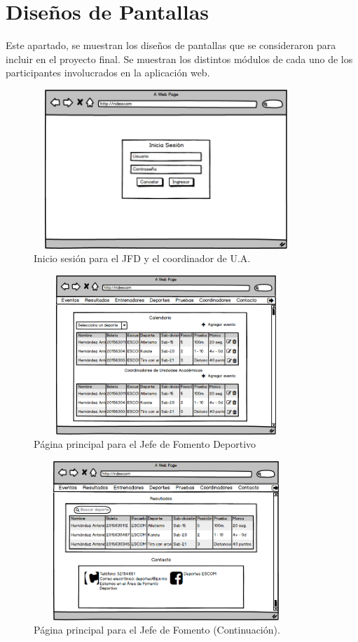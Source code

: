 \chapter{Diseños de Pantallas}
	\label{diseños}
	\noindent Este apartado, se muestran los diseños de pantallas que se consideraron para incluir en el proyecto final. Se muestran los distintos módulos de cada uno de los participantes involucrados en la aplicación web.
	
		\begin{figure}[hbt!]
			\centering
			\includegraphics[width=10cm, height=6cm]{Imagenes/Nuevos/P1_LoginJFD_coord}
			\caption{Inicio sesión para el JFD y el coordinador de U.A.}
			\label{inicioJFDycoord}
		\end{figure}
		\pagebreak
		
		\begin{figure}[hbt!]
			\centering
			\includegraphics[width=10cm, height=6cm]{Imagenes/Nuevos/P2_Inicio_JefeFD}
			\caption{Página principal para el Jefe de Fomento Deportivo}
			\label{principalJFD}
		\end{figure}
	
		\begin{figure} [hbt!]
			\centering
			\includegraphics[width=10cm, height=6cm]{Imagenes/Nuevos/P3_Inicio_JefeFD1}
			\caption{Página principal para el Jefe de Fomento (Continuación).}
			\label{principalJFD1}
		\end{figure}
	
